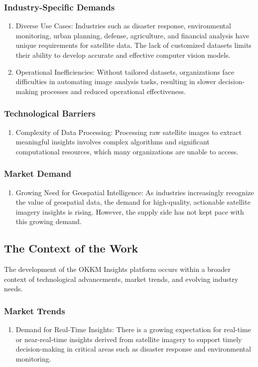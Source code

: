 \documentclass[12pt]{article}
\begin{document}
\subsubsection{Industry-Specific Demands}
\begin{enumerate}
    \item Diverse Use Cases: Industries such as disaster response, environmental monitoring, urban planning, defense, agriculture, and financial analysis have unique requirements for satellite data. The lack of customized datasets limits their ability to develop accurate and effective computer vision models.
    \item Operational Inefficiencies: Without tailored datasets, organizations face difficulties in automating image analysis tasks, resulting in slower decision-making processes and reduced operational effectiveness.
\end{enumerate}
\subsubsection{Technological Barriers}
\begin{enumerate}
    \item Complexity of Data Processing: Processing raw satellite images to extract meaningful insights involves complex algorithms and significant computational resources, which many organizations are unable to access.
\end{enumerate}
\subsubsection{Market Demand}
\begin{enumerate}
    \item Growing Need for Geospatial Intelligence: As industries increasingly recognize the value of geospatial data, the demand for high-quality, actionable satellite imagery insights is rising. However, the supply side has not kept pace with this growing demand.
\end{enumerate}
\subsection{The Context of the Work}
The development of the OKKM Insights platform occurs within a broader context of technological advancements, market trends, and evolving industry needs.
\subsubsection{Market Trends}
\begin{enumerate}
    \item Demand for Real-Time Insights: There is a growing expectation for real-time or near-real-time insights derived from satellite imagery to support timely decision-making in critical areas such as disaster response and environmental monitoring.
\end{enumerate}
\end{document}
